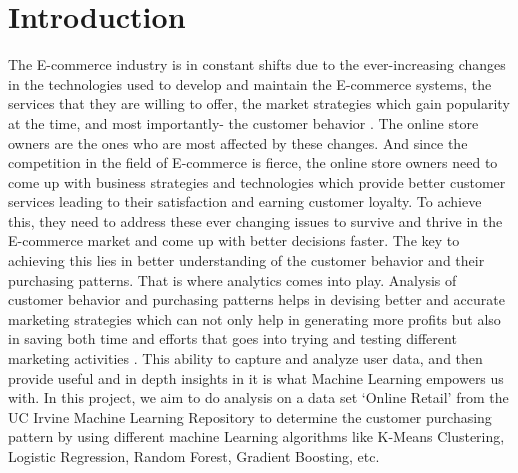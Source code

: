 \section*{Introduction}
The E-commerce industry is in constant shifts due to the ever-increasing changes in the technologies used to develop and maintain the E-commerce systems, the services that they are willing to offer, the market strategies which gain popularity at the time, and most importantly-  the customer behavior \cite{link1}. The online store owners are the ones who are most affected by these changes. And since the competition in the field of E-commerce is fierce, the online store owners need to come up with business strategies and technologies which provide better customer services leading to their satisfaction and earning customer loyalty. To achieve this, they need to address these ever changing issues to survive and thrive in the E-commerce market and come up with better decisions faster. The key to achieving this lies in better understanding of the customer behavior and their purchasing patterns. That is where analytics comes into play. Analysis of customer behavior and purchasing patterns helps in devising better and accurate marketing strategies which can not only help in generating more profits but also in saving both time and efforts that goes into trying and testing different marketing activities \cite{link1}. This ability to capture and analyze user data, and then provide useful and in depth insights in it is what Machine Learning empowers us with. In this project, we aim to do analysis on a data set `Online Retail' from the UC Irvine Machine Learning Repository to determine the customer purchasing pattern by using different machine Learning algorithms like K-Means Clustering, Logistic Regression, Random Forest, Gradient Boosting, etc.

